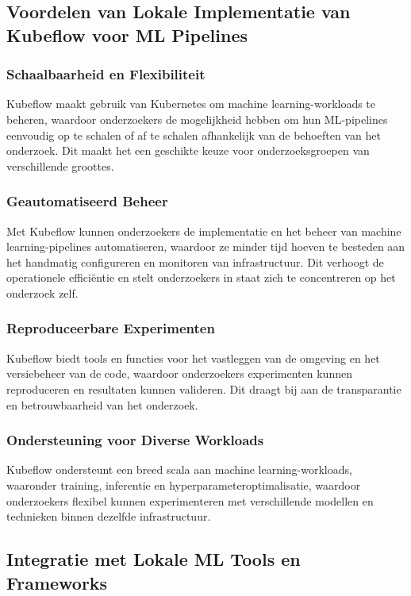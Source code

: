 \subsection{Voordelen van Lokale Implementatie van Kubeflow voor ML Pipelines}

\subsubsection{Schaalbaarheid en Flexibiliteit}
Kubeflow maakt gebruik van Kubernetes om machine learning-workloads te beheren, waardoor onderzoekers de mogelijkheid hebben om hun ML-pipelines eenvoudig op te schalen of af te schalen afhankelijk van de behoeften van het onderzoek. Dit maakt het een geschikte keuze voor onderzoeksgroepen van verschillende groottes.

\subsubsection{Geautomatiseerd Beheer}
Met Kubeflow kunnen onderzoekers de implementatie en het beheer van machine learning-pipelines automatiseren, waardoor ze minder tijd hoeven te besteden aan het handmatig configureren en monitoren van infrastructuur. Dit verhoogt de operationele efficiëntie en stelt onderzoekers in staat zich te concentreren op het onderzoek zelf.

\subsubsection{Reproduceerbare Experimenten}
Kubeflow biedt tools en functies voor het vastleggen van de omgeving en het versiebeheer van de code, waardoor onderzoekers experimenten kunnen reproduceren en resultaten kunnen valideren. Dit draagt bij aan de transparantie en betrouwbaarheid van het onderzoek.

\subsubsection{Ondersteuning voor Diverse Workloads}
Kubeflow ondersteunt een breed scala aan machine learning-workloads, waaronder training, inferentie en hyperparameteroptimalisatie, waardoor onderzoekers flexibel kunnen experimenteren met verschillende modellen en technieken binnen dezelfde infrastructuur.

\subsection{Integratie met Lokale ML Tools en Frameworks}

